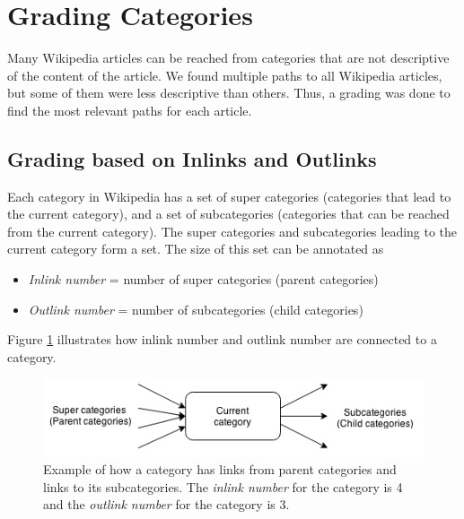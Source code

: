 
\section{Grading Categories}
Many Wikipedia articles can be reached from categories that are not descriptive of the content of the article. We found multiple paths to all Wikipedia articles, but some of them were less descriptive than others. Thus, a grading was done to find the most relevant paths for each article. 

\subsection{Grading based on Inlinks and Outlinks}
Each category in Wikipedia has a set of super categories (categories that lead to the current category), and a set of subcategories (categories that can be reached from the current category). The super categories and subcategories leading to the current category form a set. The size of this set can be annotated as 
\begin{itemize}
\item \emph{Inlink number} = number of super categories (parent categories)
\item \emph{Outlink number} = number of subcategories (child categories)
\end{itemize}
Figure \ref{fig:Categorywparentandsub2} illustrates how  inlink number and outlink number are connected to a category. 


\begin{figure}[h]
\centering
\includegraphics[width=\textwidth]{Chapters/Methods/category_parent_sub}
\caption[Example of \emph{inlink number} and \emph{outlink number} for a category]{Example of how a category has links from parent categories and links to its subcategories. The \emph{inlink number} for the category is 4 and the \emph{outlink number} for the category is 3.}
\label{fig:Categorywparentandsub2}
\end{figure}

